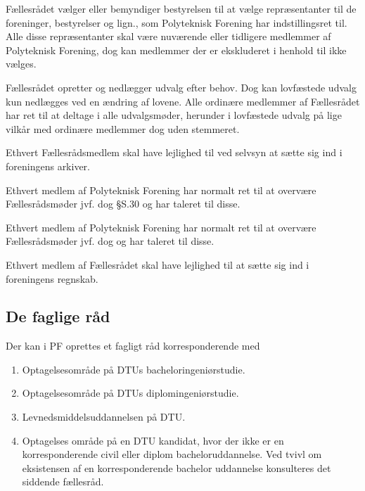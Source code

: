 \begin{list}
\item Fællesrådet vælger eller bemyndiger bestyrelsen til at vælge repræsentanter til de foreninger, bestyrelser og lign., som Polyteknisk Forening har indstillingsret til. Alle disse repræsentanter skal være nuværende eller tidligere medlemmer af Polyteknisk Forening, dog kan medlemmer der er ekskluderet i henhold til  ikke vælges.

\item Fællesrådet opretter og nedlægger udvalg efter behov. Dog kan lovfæstede udvalg kun nedlægges ved en ændring af lovene. Alle ordinære medlemmer af Fællesrådet har ret til at deltage i alle udvalgsmøder, herunder i lovfæstede udvalg på lige vilkår med ordinære medlemmer dog uden stemmeret.

\item Ethvert Fællesrådsmedlem skal have lejlighed til ved selvsyn at sætte sig ind i foreningens arkiver.

\item Ethvert medlem af Polyteknisk Forening har normalt ret til at overvære Fællesrådsmøder jvf. dog §S.30 og har taleret til disse.

\item Ethvert medlem af Polyteknisk Forening har normalt ret til at overvære Fællesrådsmøder jvf. dog  og har taleret til disse.

\item Ethvert medlem af Fællesrådet skal have lejlighed til at sætte sig ind i foreningens regnskab.



\subsection{De faglige råd}
\label{L:kap:Faglige}

\item \label{L4:hvem} Der kan i PF oprettes et fagligt råd korresponderende med
	\begin{enumerate}
	\item Optagelsesområde på DTUs bacheloringeniørstudie.
	\item Optagelsesområde på DTUs diplomingeniørstudie.
	\item Levnedsmiddelsuddannelsen på DTU.
	\item Optagelses område på en DTU kandidat, hvor der ikke er en korresponderende civil eller diplom bacheloruddannelse. Ved tvivl om eksistensen af en korresponderende bachelor uddannelse konsulteres det siddende fællesråd.
	\end{enumerate}     
    

\end{list}
